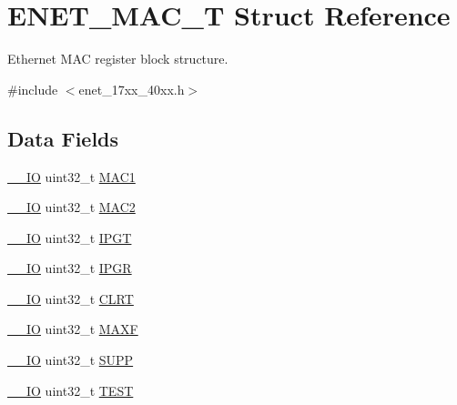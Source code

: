 \hypertarget{structENET__MAC__T}{\section{E\-N\-E\-T\-\_\-\-M\-A\-C\-\_\-\-T Struct Reference}
\label{structENET__MAC__T}
}


Ethernet M\-A\-C register block structure.  




{\ttfamily \#include $<$enet\-\_\-17xx\-\_\-40xx.\-h$>$}

\subsection*{Data Fields}
\begin{DoxyCompactItemize}
\item 
\hyperlink{core__cm3_8h_aec43007d9998a0a0e01faede4133d6be}{\-\_\-\-\_\-\-I\-O} uint32\-\_\-t \hyperlink{structENET__MAC__T_a1e758365774fda3ac9c11922c4a7ef35}{M\-A\-C1}
\item 
\hyperlink{core__cm3_8h_aec43007d9998a0a0e01faede4133d6be}{\-\_\-\-\_\-\-I\-O} uint32\-\_\-t \hyperlink{structENET__MAC__T_a925a92dbe2a48105e6497378a8cdfcac}{M\-A\-C2}
\item 
\hyperlink{core__cm3_8h_aec43007d9998a0a0e01faede4133d6be}{\-\_\-\-\_\-\-I\-O} uint32\-\_\-t \hyperlink{structENET__MAC__T_ac73d8d2cf290a3b9dc117340fc093d7e}{I\-P\-G\-T}
\item 
\hyperlink{core__cm3_8h_aec43007d9998a0a0e01faede4133d6be}{\-\_\-\-\_\-\-I\-O} uint32\-\_\-t \hyperlink{structENET__MAC__T_adcccddf8623def0f5a9aeee408312664}{I\-P\-G\-R}
\item 
\hyperlink{core__cm3_8h_aec43007d9998a0a0e01faede4133d6be}{\-\_\-\-\_\-\-I\-O} uint32\-\_\-t \hyperlink{structENET__MAC__T_afdf0e932f04510c6e77bb13a4592cf13}{C\-L\-R\-T}
\item 
\hyperlink{core__cm3_8h_aec43007d9998a0a0e01faede4133d6be}{\-\_\-\-\_\-\-I\-O} uint32\-\_\-t \hyperlink{structENET__MAC__T_a5e6d2bc05984b815f245d2ebd3c067a3}{M\-A\-X\-F}
\item 
\hyperlink{core__cm3_8h_aec43007d9998a0a0e01faede4133d6be}{\-\_\-\-\_\-\-I\-O} uint32\-\_\-t \hyperlink{structENET__MAC__T_ad7232a883f980074136d81f8a15d8bb5}{S\-U\-P\-P}
\item 
\hyperlink{core__cm3_8h_aec43007d9998a0a0e01faede4133d6be}{\-\_\-\-\_\-\-I\-O} uint32\-\_\-t \hyperlink{structENET__MAC__T_a3ba308b4a368f475aa4b2136faa88f6f}{T\-E\-S\-T}

\end{DoxyCompactItemize}

